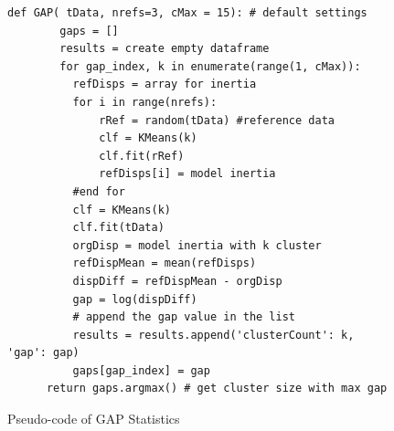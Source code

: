 \documentclass[sigconf]{acmart}
\theoremstyle{break}
\begin{document}
    \begin{figure}[!t]
    \small
     \begin{lstlisting}[mathescape,linewidth=7.5cm,frame=none,numbers=right]
      def GAP( tData, nrefs=3, cMax = 15): # default settings
        gaps = []
        results = create empty dataframe
        for gap_index, k in enumerate(range(1, cMax)):
          refDisps = array for inertia
          for i in range(nrefs):
              rRef = random(tData) #reference data
              clf = KMeans(k)
              clf.fit(rRef)
              refDisps[i] = model inertia
          #end for
          clf = KMeans(k)
          clf.fit(tData)
          orgDisp = model inertia with k cluster
          refDispMean = mean(refDisps)
          dispDiff = refDispMean - orgDisp
          gap = log(dispDiff)
          # append the gap value in the list 
          results = results.append('clusterCount': k, 'gap': gap) 
          gaps[gap_index] = gap
      return gaps.argmax() # get cluster size with max gap
            \end{lstlisting} 
            \vspace{-0.2cm}
            \caption{Pseudo-code of GAP Statistics}
            \label{fig:GAP_pseudocode} 
            \vspace{-0.3cm}
    \end{figure}
\end{document}
